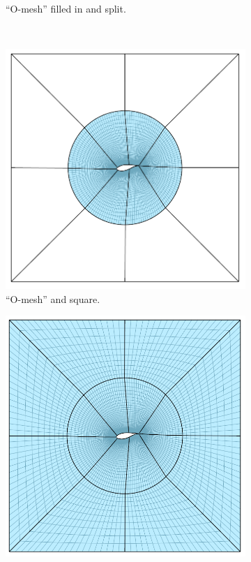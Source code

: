 \documentclass[3p,times,procedia]{elsarticle}
\begin{document}
\begin{figure}
\begin{subfigure}[b]{0.4\textwidth}
    \caption{``O-mesh'' filled in and split.}
    \label{fig:tfi:2}
  \end{subfigure}
  \\ \vspace{0.4cm}
  \begin{subfigure}[b]{0.4\textwidth}
    \includegraphics[width=\textwidth]{figs/tfi-3}
    \caption{``O-mesh'' and square.}
    \label{fig:tfi:3}
  \end{subfigure}
  \begin{subfigure}[b]{0.4\textwidth}
    \includegraphics[width=\textwidth]{figs/tfi-4}

\end{subfigure}
\end{figure}
\end{document}
